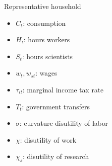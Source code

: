\documentclass[11pt,aspectratio=169]{beamer}
\begin{document}
\begin{frame}{Representative household}
	\small
	\vspace{4mm}
	\hspace{-8mm}
	\begin{minipage}[t!]{0.26\textwidth}
		\vspace{7mm}
		\begin{itemize}
			\item[] $C_{t}$: consumption\vspace{-2mm}
			\item[] $H_{t}$: hours workers\vspace{-2mm}
			\item[] $S_{t}$: hours scientists\vspace{-2mm}
		\end{itemize}
	\end{minipage}
	\begin{minipage}[t!]{0.37\textwidth}
		\vspace{8mm}
		\begin{itemize}
			\item[] $w_{t}, w_{st}$: wages  \vspace{-2mm}
			\item[] $\tau_{\iota t}$: marginal income tax rate 
			\vspace{-2mm}	
			\item[] $T_{t}$: government transfers
		\end{itemize}
	\end{minipage}
	\begin{minipage}[t!]{0.39\textwidth}
		\vspace{8mm}
		\begin{itemize}
			\item[] $\sigma$: curvature disutility of labor  \vspace{-2mm}
			\item[] $\chi$: disutility of work
			\vspace{-2mm}	
			\item[] $\chi_s$: disutility of research
		\end{itemize}
	\end{minipage}
	
\end{frame}
\end{document}

